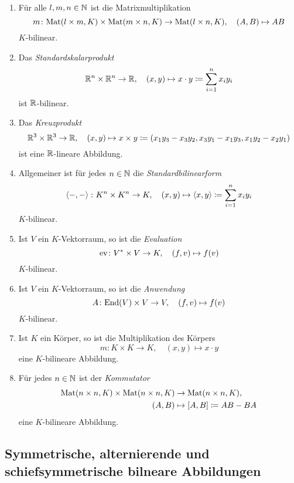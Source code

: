 \begin{bsp}
 \begin{enumerate}[leftmargin=*]
  \item
   Für alle $l,m,n \in \mathbb{N}$ ist die Matrixmultiplikation
   \[
    m \colon \mathrm{Mat}(l \times m, K) \times \mathrm{Mat}(m \times n, K) \to \mathrm{Mat}(l \times n, K), \quad (A,B) \mapsto AB
   \]
   $K$-bilinear.
  \item
   Das \emph{Standardskalarprodukt}
   \[
    \mathbb{R}^n \times \mathbb{R}^n \to \mathbb{R}, \quad (x,y) \mapsto x \cdot y \coloneqq \sum_{i=1}^n x_i y_i
   \]
   ist $\mathbb{R}$-bilinear.
  \item
   Das \emph{Kreuzprodukt}
   \[
    \mathbb{R}^3 \times \mathbb{R}^3 \to \mathbb{R},
    \quad
    (x,y) \mapsto x \times y \coloneqq (x_1 y_3 - x_3 y_2, x_3 y_1 - x_1 y_3, x_1 y_2 - x_2 y_1)
   \]
   ist eine $\mathbb{R}$-lineare Abbildung.
  \item
   Allgemeiner ist für jedes $n \in \mathbb{N}$ die \emph{Standardbilinearform}
   \[
    \left\langle -,- \right\rangle \colon K^n \times K^n \to K, \quad (x,y) \mapsto \left\langle x,y \right\rangle \coloneqq \sum_{i=1}^n x_i y_i
   \]
   $K$-bilinear.
  \item
   Ist $V$ ein $K$-Vektorraum, so ist die \emph{Evaluation}
   \[
    \mathrm{ev} \colon V^* \times V \to K, \quad (f, v) \mapsto f(v)
   \]
   $K$-bilinear.
  \item
   Ist $V$ ein $K$-Vektorraum, so ist die \emph{Anwendung}
   \[
    A \colon \mathrm{End}(V) \times V \to V, \quad (f, v) \mapsto f(v)
   \]
   $K$-bilinear.
  \item
   Ist $K$ ein Körper, so ist die Multiplikation des Körpers
   \[
    m \colon K \times K \to K, \quad (x,y) \mapsto x \cdot y
   \]
   eine $K$-bilineare Abbildung.
  \item
   Für jedes $n \in \mathbb{N}$ ist der \emph{Kommutator}
   \begin{align*}
    \mathrm{Mat}(n \times n, K) \times \mathrm{Mat}(n \times n, K) &\to \mathrm{Mat}(n \times n, K), \\
    (A,B) &\mapsto [A,B] \coloneqq AB-BA
   \end{align*}
   eine $K$-bilineare Abbildung.
 \end{enumerate}
\end{bsp}


\subsection{Symmetrische, alternierende und schiefsymmetrische bilneare Abbildungen}


